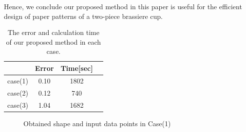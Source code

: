 \documentclass[E]{scitrans}
\begin{document}
Hence, we conclude our proposed method in this paper is useful for the efficient design of paper patterns of a two-piece brassiere cup.
\begin{table}[!h]
	\centering
	\begin{tabular}{|c|c|c|c|} \hline
		& Error & Time[sec] \\ \hline
		case(1) & 0.10 & 1802 \\ \hline
		case(2) & 0.12 & 740 \\ \hline
		case(3) & 1.04& 1682 \\ \hline
	\end{tabular}
	\caption{The error and calculation time of our proposed method in each case.}
	\label{tbl:error and calc}
\end{table}

\begin{figure}[h]
	\centering
	\hfil
	\hfil
	\caption{Obtained shape and input data points in Case(1)}
	\label{fig:ObtainedSurfaceNDS}
\end{figure}
\end{document}
